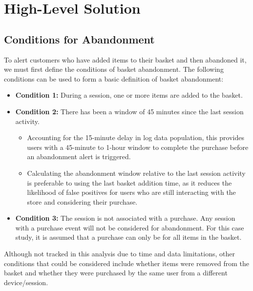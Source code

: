 \documentclass[a4paper,11pt,leqno,openbib,oldfontcommands,oneside]{memoir}
\begin{document}
\mainmatter

\section{High-Level Solution}
\label{sec:Part1}

\subsection{Conditions for Abandonment}
To alert customers who have added items to their basket and then abandoned it, we must first define the conditions of basket abandonment. The following conditions can be used to form a basic definition of basket abandonment:

\begin{itemize}
    \item \textbf{Condition 1:} During a session, one or more items are added to the basket.
    \item \textbf{Condition 2:} There has been a window of 45 minutes since the last session activity. 
    \begin{itemize}
        \item Accounting for the 15-minute delay in log data population, this provides users with a 45-minute to 1-hour window to complete the purchase before an abandonment alert is triggered.
        \item Calculating the abandonment window relative to the last session activity is preferable to using the last basket addition time, as it reduces the likelihood of false positives for users who are still interacting with the store and considering their purchase.
    \end{itemize}
    \item \textbf{Condition 3:} The session is not associated with a purchase. Any session with a purchase event will not be considered for abandonment. For this case study, it is assumed that a purchase can only be for all items in the basket.
\end{itemize}

\begin{center}
\begin{tcolorbox}[sidenote]
Although not tracked in this analysis due to time and data limitations, other conditions that could be considered include whether items were removed from the basket and whether they were purchased by the same user from a different device/session.
\end{tcolorbox}
\end{center}
\end{document}
